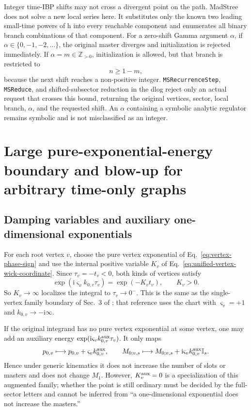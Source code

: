 \documentclass[11pt,a4paper]{article}
\newcommand{\ii}{\mathrm i}
\newcommand{\Id}{\mathbb I}
\begin{document}
Integer time-IBP shifts may not cross a divergent point on the path. MadStree does not solve a new local
series here. It substitutes only the known two leading small-time powers of h into every reachable
component and enumerates all binary branch combinations of that component. For a zero-shift Gamma
argument $\alpha$, if $\alpha\in\{0,-1,-2,\ldots\}$, the original master diverges and initialization
is rejected immediately. If $\alpha=m\in\mathbb Z_{>0}$, initialization is allowed, but that branch
is restricted to
\begin{equation}
 n\geq 1-m,
\end{equation}
because the next shift reaches a non-positive integer. \texttt{MSRecurrenceStep},
\texttt{MSReduce}, and shifted-subsector reduction in the dlog reject only an actual request that
crosses this bound, returning the original vertices, sector, local branch, $\alpha$, and the
requested shift. An $\alpha$ containing a symbolic analytic regulator remains symbolic and is not
misclassified as an integer.

\section{Large pure-exponential-energy boundary and blow-up for arbitrary time-only graphs}
\label{sec:boundary-blowup}

\subsection{Damping variables and auxiliary one-dimensional exponentials}

For each root vertex $v$, choose the pure vertex exponential of Eq.~\eqref{eq:vertex-phase-sign} and use the internal positive variable $K_v$ of Eq.~\eqref{eq:unified-vertex-wick-coordinate}. Since $\tau_v=-t_v<0$, both kinds of vertices satisfy
\begin{equation}
 \exp(\ii\varsigma_vk_{0,v}\tau_v)=\exp(-K_vt_v),
 \qquad K_v>0.
 \label{eq:wick-damping-energy}
\end{equation}
So $K_v\to\infty$ localizes the integral to $\tau_v\to0^-$. This is the same as the single-vertex family boundary of Sec.~3 of \cite{Chen:2024jms}; that reference uses the chart with $\varsigma_v=+1$ and $k_{0,v}\to-\ii\infty$.

If the original integrand has no pure vertex exponential at some vertex, one may add an auxiliary energy $\exp(\ii\varsigma_vk_{0,v}^{\rm aux}\tau_v)$. It only maps
\begin{equation}
 p_{0,v}\longmapsto p_{0,v}+\varsigma_vk_{0,v}^{\rm aux},
 \qquad
 M_{0;v,s}\longmapsto M_{0;v,s}
 +\ii\varsigma_vk_{0,v}^{\rm aux}\Id_s .
 \label{eq:auxiliary-energy-M0-shift}
\end{equation}
Hence under generic kinematics it does not increase the number of slots or masters and does not change $M_1$. However, $K_v^{\rm aux}=0$ is a specialization of this augmented family; whether the point is still ordinary must be decided by the full-sector letters and cannot be inferred from ``a one-dimensional exponential does not increase the masters.''
\end{document}
